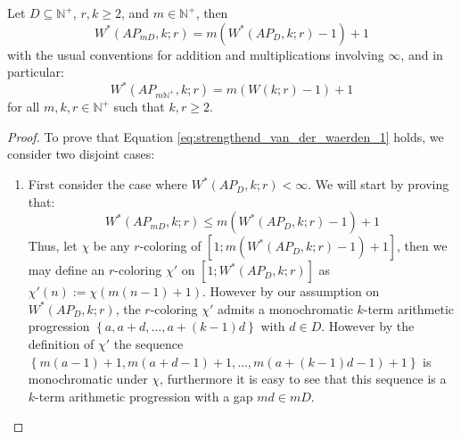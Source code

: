 \begin{theorem} \label{thm:strengthend_version_of_van_der_waerden}
	Let $D \subseteq \mathbb{N}^{+}$, $r, k \geq 2$, and $m \in \mathbb{N}^{+}$, then
	\begin{equation}\label{eq:strengthend_van_der_waerden_1}
		W^{*}(AP_{mD}, k; r) = m(W^{*}(AP_D, k; r) - 1) + 1
	\end{equation}
	with the usual conventions for addition and multiplications involving $\infty$, and in particular:
	\begin{equation}\label{eq:strengthed_van_der_waerden_2}
		W^{*}(AP_{m\mathbb{N}^{+}}, k; r) = m(W(k; r) - 1) + 1
	\end{equation}
	for all $m, k, r \in \mathbb{N}^{+}$ such that $k, r \geq 2$.
\end{theorem}
\begin{proof}
	To prove that Equation \eqref{eq:strengthend_van_der_waerden_1} holds, we consider two disjoint cases:
	\begin{enumerate}
		\item First consider the case where $W^{*}(AP_D, k; r) < \infty$. We will start by proving that:
		      \begin{equation*}
			      W^{*}(AP_{mD}, k; r) \leq m(W^{*}(AP_D, k; r) - 1) + 1
		      \end{equation*}
		      Thus, let $\chi$ be any $r$-coloring of $[1; m(W^{*}(AP_D, k; r) - 1) + 1]$, then we may define an $r$-coloring $\chi'$ on $[1; W^{*}(AP_D, k; r)]$ as $\chi'(n) := \chi(m(n - 1) + 1)$.
		      However by our assumption on $W^{*}(AP_D, k; r)$, the $r$-coloring $\chi'$ admits a monochromatic $k$-term arithmetic progression $\left\{a, a + d, \ldots, a + (k - 1)d\right\}$ with $d \in D$.
		      However by the definition of $\chi'$ the sequence $\left\{m(a - 1) + 1, m(a + d - 1) + 1, \ldots, m(a + (k - 1)d - 1) + 1\right\}$ is monochromatic under $\chi$, furthermore it is easy to see that this sequence is a $k$-term arithmetic progression with a gap $md \in mD$.


\end{enumerate}
\end{proof}
